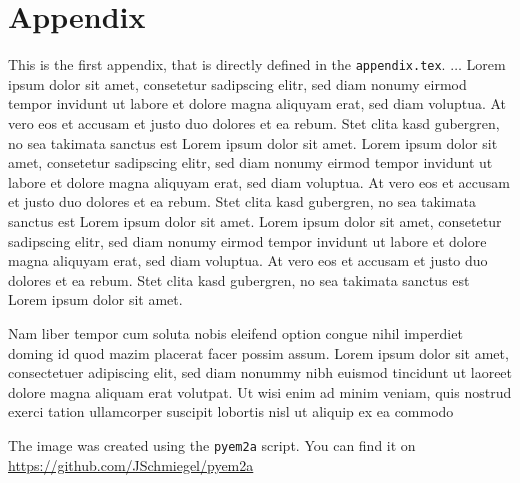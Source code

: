 \chapter{Appendix}
\renewcommand{\thefigure}{\Alph{section}.\arabic{figure}}
\renewcommand{\thetable}{\Alph{section}.\arabic{table}}
\renewcommand{\thecode}{\Alph{section}.\arabic{code}}
\renewcommand{\thesection}{\Alph{section}}
\renewcommand{\thesubsection}{\Alph{section}.\arabic{subsection}}
\begin{fullwidth}
    \localtableofcontents
\end{fullwidth}

\label{app:appendix1}
This is the first appendix, that is directly defined in the \texttt{appendix.tex}. $\dots$ Lorem ipsum dolor sit amet, consetetur sadipscing elitr, sed diam nonumy eirmod tempor invidunt ut labore et dolore magna aliquyam erat, sed diam voluptua. At vero eos et accusam et justo duo dolores et ea rebum. Stet clita kasd gubergren, no sea takimata sanctus est Lorem ipsum dolor sit amet. Lorem ipsum dolor sit amet, consetetur sadipscing elitr, sed diam nonumy eirmod tempor invidunt ut labore et dolore magna aliquyam erat, sed diam voluptua. At vero eos et accusam et justo duo dolores et ea rebum. Stet clita kasd gubergren, no sea takimata sanctus est Lorem ipsum dolor sit amet. Lorem ipsum dolor sit amet, consetetur sadipscing elitr, sed diam nonumy eirmod tempor invidunt ut labore et dolore magna aliquyam erat, sed diam voluptua. At vero eos et accusam et justo duo dolores et ea rebum. Stet clita kasd gubergren, no sea takimata sanctus est Lorem ipsum dolor sit amet.


Nam liber tempor cum soluta nobis eleifend option congue nihil imperdiet doming id quod mazim placerat facer possim assum. Lorem ipsum dolor sit amet, consectetuer adipiscing elit, sed diam nonummy nibh euismod tincidunt ut laoreet dolore magna aliquam erat volutpat. Ut wisi enim ad minim veniam, quis nostrud exerci tation ullamcorper suscipit lobortis nisl ut aliquip ex ea commodo



\label{app:appendix3}
The image was created using the \texttt{pyem2a} script. You can find it on \url{https://github.com/JSchmiegel/pyem2a}